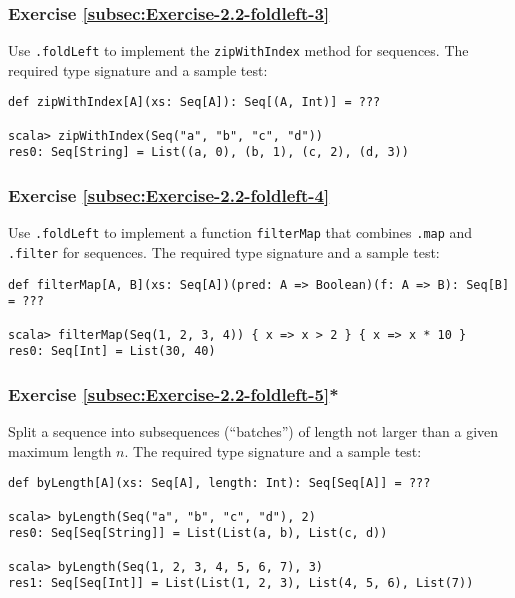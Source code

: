 \subsubsection{Exercise \label{subsec:Exercise-2.2-foldleft-3}\ref{subsec:Exercise-2.2-foldleft-3}}

Use \lstinline!.foldLeft! to implement the \lstinline!zipWithIndex!
method for sequences. The required type signature and a sample test:
\begin{lstlisting}
def zipWithIndex[A](xs: Seq[A]): Seq[(A, Int)] = ???

scala> zipWithIndex(Seq("a", "b", "c", "d"))
res0: Seq[String] = List((a, 0), (b, 1), (c, 2), (d, 3))
\end{lstlisting}


\subsubsection{Exercise \label{subsec:Exercise-2.2-foldleft-4}\ref{subsec:Exercise-2.2-foldleft-4}}

Use \lstinline!.foldLeft! to implement a function \lstinline!filterMap!
that combines \lstinline!.map! and \lstinline!.filter! for sequences.
The required type signature and a sample test:
\begin{lstlisting}
def filterMap[A, B](xs: Seq[A])(pred: A => Boolean)(f: A => B): Seq[B] = ???

scala> filterMap(Seq(1, 2, 3, 4)) { x => x > 2 } { x => x * 10 }
res0: Seq[Int] = List(30, 40)
\end{lstlisting}


\subsubsection{Exercise \label{subsec:Exercise-2.2-foldleft-5}\ref{subsec:Exercise-2.2-foldleft-5}{*}}

Split a sequence into subsequences (``batches'') of length not larger
than a given maximum length $n$. The required type signature and
a sample test:
\begin{lstlisting}
def byLength[A](xs: Seq[A], length: Int): Seq[Seq[A]] = ???

scala> byLength(Seq("a", "b", "c", "d"), 2)
res0: Seq[Seq[String]] = List(List(a, b), List(c, d))

scala> byLength(Seq(1, 2, 3, 4, 5, 6, 7), 3)
res1: Seq[Seq[Int]] = List(List(1, 2, 3), List(4, 5, 6), List(7))
\end{lstlisting}
\begin{comment}
Solution:
\begin{lstlisting}
def batching[A](xs: Seq[A], size: Int): Seq[Seq[A]] = {  
  type Acc = (Seq[Seq[A]], Seq[A], Int)
  val init: Acc = ((Seq(), Seq(), 0))
  val (result, rem, _) = xs.foldLeft(init){ case ((seq, rem, len), x) =>
    val newLen = len + 1
    if (newLen > size) (seq ++ Seq(rem), Seq(x), 1)
    else (seq, rem ++ Seq(x), newLen)
  }
  result ++ Seq(rem)
}
\end{lstlisting}
\end{comment}


